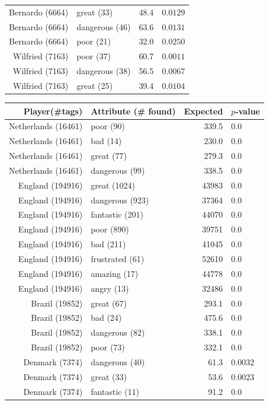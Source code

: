 \documentclass[10pt, a4paper]{UUThesisTemplate}
\begin{document}
\begin{table}
\begin{minipage}[t]{8cm}
\begin{tabular}{r l r l}
Bernardo (6664) & great (33) & 48.4 & $0.0129$\\
Bernardo (6664) & dangerous (46) & 63.6 & $0.0131$\\
Bernardo (6664) & poor (21) & 32.0 & $0.0250$\\
Wilfried (7163) & poor (37) & 60.7 & $0.0011$\\
Wilfried (7163) & dangerous (38) & 56.5 & $0.0067$\\
Wilfried (7163) & great (25) & 39.4 & $0.0104$\\\hline
\end{tabular}
\end{minipage}
\begin{minipage}[t]{8cm}
\scriptsize\vspace{0pt}
\begin{tabular}{r l r l}
Player(\#tags) & Attribute (\# found) & Expected & $p$-value\\\hline
Netherlands (16461) & poor (90) & 339.5 & $0.0$\\
Netherlands (16461) & bad (14) & 230.0 & $0.0$\\
Netherlands (16461) & great (77) & 279.3 & $0.0$\\
Netherlands (16461) & dangerous (99) & 338.5 & $0.0$\\
England (194916) & great (1024) & 43983 & $0.0$\\
England (194916) & dangerous (923) & 37364 & $0.0$\\
England (194916) & fantastic (201) & 44070 & $0.0$\\
England (194916) & poor (890) & 39751 & $0.0$\\
England (194916) & bad (211) & 41045 & $0.0$\\
England (194916) & frustrated (61) & 52610 & $0.0$\\
England (194916) & amazing (17) & 44778 & $0.0$\\
England (194916) & angry (13) & 32486 & $0.0$\\
Brazil (19852) & great (67) & 293.1 & $0.0$\\
Brazil (19852) & bad (24) & 475.6 & $0.0$\\
Brazil (19852) & dangerous (82) & 338.1 & $0.0$\\
Brazil (19852) & poor (73) & 332.1 & $0.0$\\
Denmark (7374) & dangerous (40) & 61.3 & $0.0032$\\
Denmark (7374) & great (33) & 53.6 & $0.0023$\\
Denmark (7374) & fantastic (11) & 91.2 & $0.0$\\

\end{tabular}
\end{minipage}
\end{table}
\end{document}
